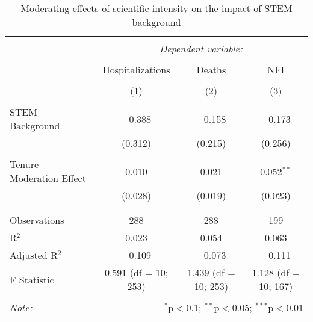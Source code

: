 
\begin{table}[!htbp] \centering 
  \caption{Moderating effects of scientific intensity on the impact of STEM background} 
  \label{} 
\begin{tabular}{@{\extracolsep{5pt}}lccc} 
\\[-1.8ex]\hline 
\hline \\[-1.8ex] 
 & \multicolumn{3}{c}{\textit{Dependent variable:}} \\ 
\cline{2-4} 
\\[-1.8ex] & Hospitalizations & Deaths & NFI \\ 
\\[-1.8ex] & (1) & (2) & (3)\\ 
\hline \\[-1.8ex] 
 STEM Background & $-$0.388 & $-$0.158 & $-$0.173 \\ 
  & (0.312) & (0.215) & (0.256) \\ 
  & & & \\ 
 Tenure Moderation Effect & 0.010 & 0.021 & 0.052$^{**}$ \\ 
  & (0.028) & (0.019) & (0.023) \\ 
  & & & \\ 
\hline \\[-1.8ex] 
Observations & 288 & 288 & 199 \\ 
R$^{2}$ & 0.023 & 0.054 & 0.063 \\ 
Adjusted R$^{2}$ & $-$0.109 & $-$0.073 & $-$0.111 \\ 
F Statistic & 0.591 (df = 10; 253) & 1.439 (df = 10; 253) & 1.128 (df = 10; 167) \\ 
\hline 
\hline \\[-1.8ex] 
\textit{Note:}  & \multicolumn{3}{r}{$^{*}$p$<$0.1; $^{**}$p$<$0.05; $^{***}$p$<$0.01} \\ 
\end{tabular} 
\end{table} 

